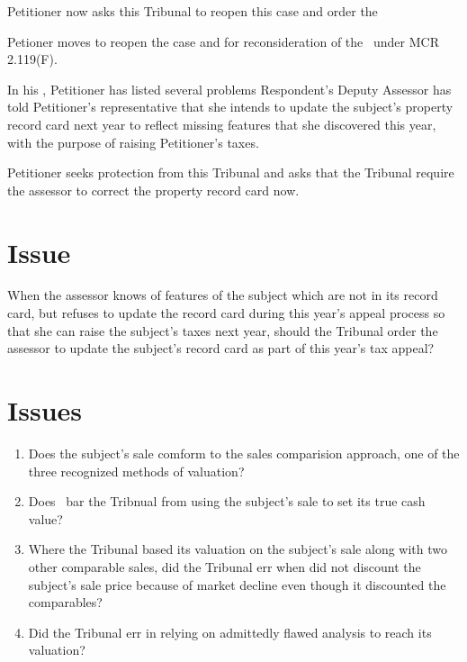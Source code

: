 \documentclass[12pt,\documentclassflag]{michiganCourtOfAppealsBrief}
\begin{document}
Petitioner now asks this Tribunal to reopen this case and order the 



Petioner moves to reopen the case and for reconsideration of the \cite{Order denying Petitioner's motion to correct record card}\ under MCR 2.119(F).

In his \cite{Exceptions}, Petitioner has listed several problems Respondent's Deputy Assessor has told Petitioner's representative that she intends to update the subject's property record card next year to reflect missing features that she discovered this year, with the purpose of raising Petitioner's taxes.

Petitioner seeks protection from this Tribunal and asks that the Tribunal require the assessor to correct the property record card now.




\section{Issue}

When the assessor knows of features of the subject which are not in its record card, but refuses to update the record card during this year's appeal process so that she can raise the subject's taxes next year, should the Tribunal order the assessor to update the subject's record card as part of this year's tax appeal?

\section{Issues}

\begin{enumerate}
\item Does the subject's sale comform to the sales comparision approach, one of the three recognized methods of valuation?
  
\item Does \cite[s]{MCL 211.27(6)}\ bar the Tribnual from using the subject's sale to set its true cash value?
  
\item Where the Tribunal based its valuation on the subject's sale along with two other comparable sales, did the Tribunal err when did not discount the subject's sale price because of market decline even though it discounted the comparables?

\item Did the Tribunal err in relying on admittedly flawed analysis to reach its valuation?
\end{enumerate}  
\end{document}
